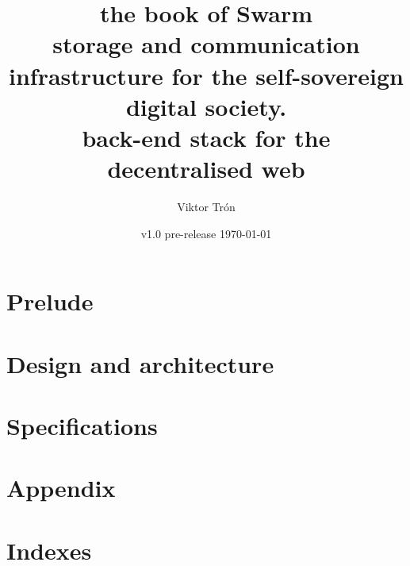 \documentclass[a4paper,12pt,openany,hyperfootnotes,hidelinks]{scrbook}
\title{\Huge\sc the book of Swarm\\
\Large storage and communication infrastructure for the self-sovereign digital society.\\
back-end stack for the decentralised web}
\author{Viktor Trón}
\date{v1.0 pre-release \today}
\newif\ifdraft
\newcommand\statusorange{\ifdraft \textcolor{orange}{WIP}\fi}
\begin{document}
\frontmatter
\maketitle
\setcounter{tocdepth}{2}

\tableofcontents
\listoffigures

\label{sec:toc}
 
\mainmatter
\part{Prelude} \label{part:preface}

\part{Design and architecture} \label{part:designarchitecture}

\part{Specifications}
\label{part:specifications}

{} 

\appendix
\part{Appendix} \label{part:appendix}

\backmatter
\part{Indexes \statusorange}
\printglossary[type=main] \label{sec:glossary}
\printglossary[nonumberlist=false, style=bookindex, title={Index}] \label{sec:index}
\printglossary[type=\acronymtype,title={List of acronyms and abbreviations}]
\end{document}
